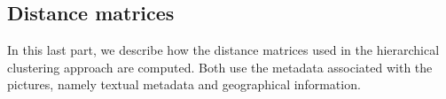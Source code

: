 \documentclass{acm_proc_article-me11_tweaked}
\begin{document}

\subsection{Distance matrices}

In this last part, we describe how the distance matrices used in the hierarchical clustering approach are computed. Both use the metadata associated with the pictures, namely textual metadata and geographical information.
\end{document}
